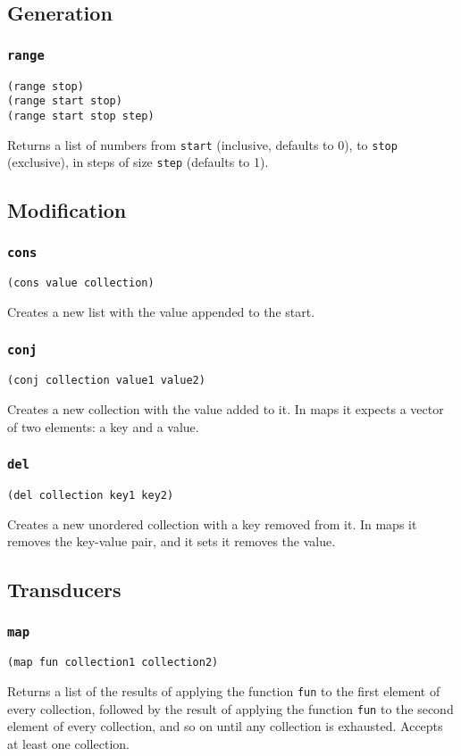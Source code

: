 \documentclass[11pt]{scrreprt}
\begin{document}
\subsection{Generation}
\subsubsection{\texttt{range}}
\begin{verbatim}
(range stop)
(range start stop)
(range start stop step)
\end{verbatim}
Returns a list of numbers from \texttt{start} (inclusive, defaults to 0), to \texttt{stop} (exclusive), in steps of size \texttt{step} (defaults to 1).


\subsection{Modification}
\subsubsection{\texttt{cons}}
\begin{verbatim}
(cons value collection)
\end{verbatim}
Creates a new list with the value appended to the start.

\subsubsection{\texttt{conj}}
\begin{verbatim}
(conj collection value1 value2)
\end{verbatim}
Creates a new collection with the value added to it. In maps it expects a vector of two elements: a key and a value.

\subsubsection{\texttt{del}}
\begin{verbatim}
(del collection key1 key2)
\end{verbatim}
Creates a new unordered collection with a key removed from it. In maps it removes the key-value pair, and it sets it removes the value.


\subsection{Transducers}
\subsubsection{\texttt{map}}
\begin{verbatim}
(map fun collection1 collection2)
\end{verbatim}
Returns a list of the results of applying the function \texttt{fun} to the first element of every collection, followed by the result of applying the function \texttt{fun} to the second element of every collection, and so on until any collection is exhausted. Accepts at least one collection.
\end{document}
